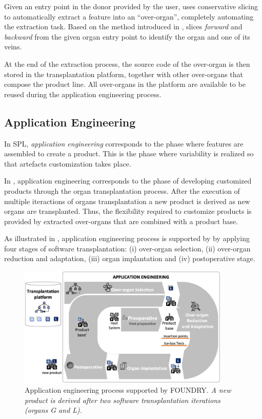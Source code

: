 Given an entry point in the donor provided by the user, \FOUNDRY uses conservative slicing to automatically extract a feature into an ``over-organ'', completely automating the extraction task. Based on the method introduced in \cite{Barr2015}, \FOUNDRY slices \emph{forward} and \emph{backward} from the given organ entry point to identify the organ and one of its veins. 

At the end of the extraction process, the source code of the over-organ is then stored in the transplantation platform, together with other over-organs that compose the product line. 
All over-organs in the platform are available to be reused during the application engineering process. 

\subsection{Application Engineering}
\label{sec:application_eng}

In SPL, \emph{application engineering} corresponds to the phase where features are assembled to create a product. This is the phase where variability is realized so that artefacts customization takes place.

In \FOUNDRY, application engineering corresponds to the phase of developing customized products through the organ transplantation process. 
After the execution of multiple iteractions of organs transplantation a new product is derived as new organs are transplanted. Thus, the flexibility required to customize products is provided by extracted over-organs that are combined with a product base.

As illustrated in , application engineering process is supported by \FOUNDRY by applying four stages of software transplantation: (i) over-organ selection, (ii) over-organ reduction and adaptation, (iii) organ implantation and (iv) postoperative stage. 

\begin{figure}[t]
	\centering  \includegraphics[width=0.9\textwidth]{images/FOUNDRY_APP5.png}
	\centering \caption{Application engineering process supported by FOUNDRY. \textit{A new product is derived after two software transplantation iterations (organs G and L).}}
	\label{fig:foundry_app}
\end{figure} 

